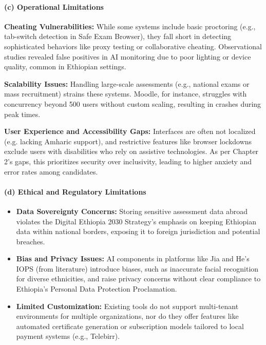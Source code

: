 \paragraph*{(c) Operational Limitations}
\begin{itemize}
    \begin{sloppypar}
        \item \textbf{Cheating Vulnerabilities:} While some systems include basic proctoring (e.g., tab-switch detection in Safe Exam Browser), they fall short in detecting sophisticated behaviors like proxy testing or collaborative cheating. Observational studies revealed false positives in AI monitoring due to poor lighting or device quality, common in Ethiopian settings.
    \end{sloppypar}
    \item \textbf{Scalability Issues:} Handling large-scale assessments (e.g., national exams or mass recruitment) strains these systems. Moodle, for instance, struggles with concurrency beyond 500 users without custom scaling, resulting in crashes during peak times.
    \item \textbf{User Experience and Accessibility Gaps:} Interfaces are often not localized (e.g. lacking Amharic support), and restrictive features like browser lockdowns exclude users with disabilities who rely on assistive technologies. As per Chapter 2's gaps, this prioritizes security over inclusivity, leading to higher anxiety and error rates among candidates.
\end{itemize}

\paragraph*{(d) Ethical and Regulatory Limitations}
\begin{itemize}
    \item \textbf{Data Sovereignty Concerns:} Storing sensitive assessment data abroad violates the Digital Ethiopia 2030 Strategy's emphasis on keeping Ethiopian data within national borders, exposing it to foreign jurisdiction and potential breaches.
    \item \textbf{Bias and Privacy Issues:} AI components in platforms like Jia and He's IOPS (from literature) introduce biases, such as inaccurate facial recognition for diverse ethnicities, and raise privacy concerns without clear compliance to Ethiopia's Personal Data Protection Proclamation.
    \item \textbf{Limited Customization:} Existing tools do not support multi-tenant environments for multiple organizations, nor do they offer features like automated certificate generation or subscription models tailored to local payment systems (e.g., Telebirr).
\end{itemize}

